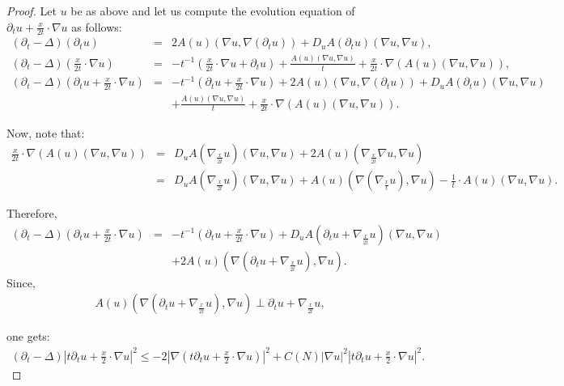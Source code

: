 \documentclass[a4paper,11pt,reqno]{amsart}
\begin{document}
\begin{proof}
Let $u$ be as above and let us compute the evolution equation of $\partial_tu+\frac{x}{2t}\cdot\nabla u$ as follows:
\begin{eqnarray*}
(\partial_t-\Delta)(\partial_tu)&=&2A(u)(\nabla u,\nabla (\partial_tu))+D_uA(\partial_tu)(\nabla u,\nabla u),\\
(\partial_t-\Delta)\left(\frac{x}{2t}\cdot\nabla u\right)&=&-t^{-1}\left(\frac{x}{2t}\cdot\nabla u+\partial_tu\right)+\frac{A(u)(\nabla u,\nabla u)}{t}+\frac{x}{2t}\cdot\nabla (A(u)(\nabla u,\nabla u)),\\
(\partial_t-\Delta)\left(\partial_tu+\frac{x}{2t}\cdot\nabla u\right)&=&-t^{-1}\left(\partial_tu+\frac{x}{2t}\cdot\nabla u\right)+2A(u)(\nabla u,\nabla (\partial_tu))+D_uA(\partial_tu)(\nabla u,\nabla u)\\
&&+\frac{A(u)(\nabla u,\nabla u)}{t}+\frac{x}{2t}\cdot\nabla (A(u)(\nabla u,\nabla u)).
\end{eqnarray*}

Now, note that:
\begin{eqnarray*}
\frac{x}{2t}\cdot\nabla (A(u)(\nabla u,\nabla u))&=&D_uA\left(\nabla_{\frac{x}{2t}}u\right)(\nabla u,\nabla u)+2A(u)\left(\nabla_{\frac{x}{2t}}\nabla u,\nabla u\right)\\
&=&D_uA\left(\nabla_{\frac{x}{2t}}u\right)(\nabla u,\nabla u)+A(u)\left(\nabla\left(\nabla_{\frac{x}{t}}u\right),\nabla u\right)-\frac{1}{t}\cdot A(u)(\nabla u,\nabla u).
\end{eqnarray*}

Therefore,
\begin{eqnarray*}
(\partial_t-\Delta)\left(\partial_tu+\frac{x}{2t}\cdot\nabla u\right)&=&-t^{-1}\left(\partial_tu+\frac{x}{2t}\cdot\nabla u\right)+D_uA\left(\partial_tu+\nabla_{\frac{x}{2t}}u\right)(\nabla u,\nabla u)\\
&&+2A(u)\left(\nabla\left(\partial_tu+\nabla_{\frac{x}{2t}}u\right),\nabla u\right).
\end{eqnarray*}
Since,
\begin{eqnarray*}
A(u)\left(\nabla\left(\partial_tu+\nabla_{\frac{x}{2t}}u\right),\nabla u\right)\perp \partial_tu+\nabla_{\frac{x}{2t}}u,
\end{eqnarray*}
 
one gets:
\begin{eqnarray*}
(\partial_t-\Delta)\left|t\partial_tu+\frac{x}{2}\cdot\nabla u\right|^2\leq-2\left|\nabla\left(t\partial_tu+\frac{x}{2}\cdot\nabla u\right)\right|^2+C(N)|\nabla u|^2\left|t\partial_tu+\frac{x}{2}\cdot\nabla u\right|^2.
\end{eqnarray*}



\end{proof}
\end{document}
